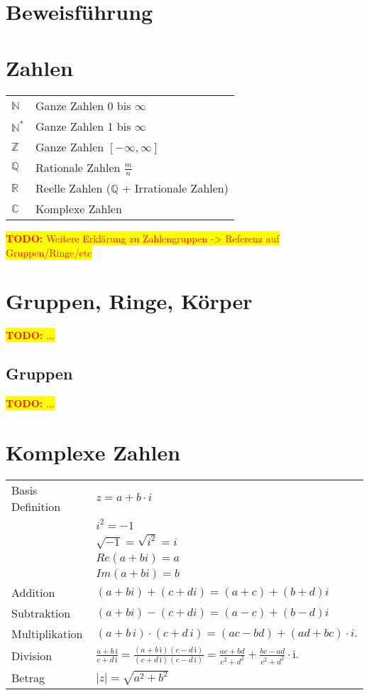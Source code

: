 \documentclass[10pt,a4paper]{article}
\newcommand{\todo}[1]{ \colorbox{yellow}{\textcolor{red}{\textbf{TODO:} {#1}}}\\ }
\begin{document}
\tableofcontents




\section{Beweisführung}



\section{Zahlen}
\begin{tabular}{ll}
$\mathbb{N}$ & Ganze Zahlen 0 bis $\infty$ \\
$\mathbb{N}^*$ & Ganze Zahlen 1 bis $\infty$ \\
$\mathbb{Z}$ & Ganze Zahlen $[-\infty, \infty]$ \\
$\mathbb{Q}$ & Rationale Zahlen $\frac{m}{n}$\\
$\mathbb{R}$ & Reelle Zahlen ($\mathbb{Q}$ + Irrationale Zahlen)\\
$\mathbb{C}$ & Komplexe Zahlen\\
\end{tabular} 

\todo{Weitere Erklärung zu Zahlengruppen -> Referenz auf Gruppen/Ringe/etc}

\section{Gruppen, Ringe, Körper}
\todo{...}

\subsection{Gruppen}
\todo{...}

\section{Komplexe Zahlen}

\renewcommand{\arraystretch}{1.5}
\begin{tabular}{ll}
Basis Definition & $ z = a + b \cdot i $ \\ 
				 & $ i^{2} = -1 $ \\ %
				 & $\sqrt{-1} = \sqrt{i^2} = i $ \\
				 & $Re(a + bi) = a$ \\
				 & $Im(a + bi) = b$ \\
Addition 		 & $ (a + bi) + (c + di) = (a+c)+(b+d)i $\\
Subtraktion 	 & $ (a + bi) - (c + di) = (a-c)+(b-d)i $\\
Multiplikation   &  $(a+b\,i)\cdot(c+d\,i)=(ac-bd) + (ad+bc)\cdot i. $\\
Division         & 
    $\frac{a+b\,\mathrm i}{c+d\,\mathrm i} = \frac{(a+b\,\mathrm i)(c-d\,\mathrm i)}{(c+d\,\mathrm i)(c-d\,\mathrm i)} = \frac{ac+bd}{c^2+d^2}+\frac{bc-ad}{c^2+d^2}\cdot\mathrm i. $\\
Betrag 			 & $ |z| = \sqrt{a^{2} + b^{2}} $ \\ 
\end{tabular} 
\end{document}
